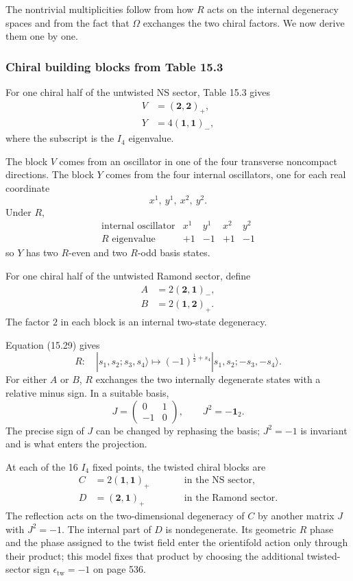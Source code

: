 \documentclass[
  10pt,
  a4paper,
  openany]{book}
\begin{document}
The nontrivial multiplicities follow from how \(R\) acts on the internal
degeneracy spaces and from the fact that \(\Omega\) exchanges the two
chiral factors. We now derive them one by one.

\subsubsection{Chiral building blocks from Table
15.3}\label{chiral-building-blocks-from-table-15.3}

For one chiral half of the untwisted NS sector, Table 15.3 gives \[
\begin{aligned}
V&=(\mathbf2,\mathbf2)_{+},\\
Y&=4(\mathbf1,\mathbf1)_{-},
\end{aligned}
\] where the subscript is the \(I_4\) eigenvalue.

The block \(V\) comes from an oscillator in one of the four transverse
noncompact directions. The block \(Y\) comes from the four internal
oscillators, one for each real coordinate \[
x^1,\ y^1,\ x^2,\ y^2.
\] Under \(R\), \[
\begin{array}{c|cccc}
\text{internal oscillator}&x^1&y^1&x^2&y^2\\ \hline
R\text{ eigenvalue}&+1&-1&+1&-1
\end{array}
\] so \(Y\) has two \(R\)-even and two \(R\)-odd basis states.

For one chiral half of the untwisted Ramond sector, define \[
\begin{aligned}
A&=2(\mathbf2,\mathbf1)_{-},\\
B&=2(\mathbf1,\mathbf2)_{+}.
\end{aligned}
\] The factor \(2\) in each block is an internal two-state degeneracy.

Equation (15.29) gives \[
R:
\quad
|s_1,s_2;s_3,s_4\rangle
\longmapsto
(-1)^{\frac12+s_4}
|s_1,s_2;-s_3,-s_4\rangle.
\] For either \(A\) or \(B\), \(R\) exchanges the two internally
degenerate states with a relative minus sign. In a suitable basis, \[
J
=
\begin{pmatrix}
0&1\\
-1&0
\end{pmatrix},
\qquad
J^2=-\mathbf1_2.
\] The precise sign of \(J\) can be changed by rephasing the basis;
\(J^2=-1\) is invariant and is what enters the projection.

At each of the 16 \(I_4\) fixed points, the twisted chiral blocks are \[
\begin{aligned}
C&=2(\mathbf1,\mathbf1)_{+}
\qquad &&\text{in the NS sector},\\
D&=(\mathbf2,\mathbf1)_{+}
\qquad &&\text{in the Ramond sector}.
\end{aligned}
\] The reflection acts on the two-dimensional degeneracy of \(C\) by
another matrix \(J\) with \(J^2=-1\). The internal part of \(D\) is
nondegenerate. Its geometric \(R\) phase and the phase assigned to the
twist field enter the orientifold action only through their product;
this model fixes that product by choosing the additional twisted-sector
sign \(\epsilon_{\mathrm{tw}}=-1\) on page 536.
\end{document}
